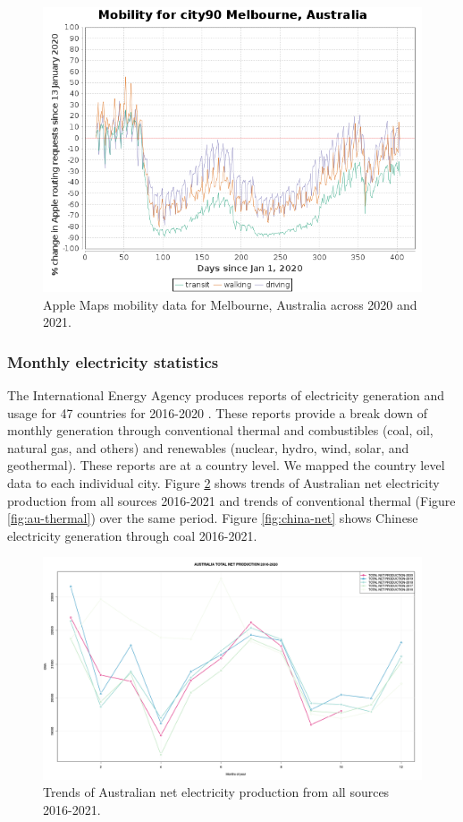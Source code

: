 \documentclass[final,3p,times,authoryear]{elsarticle}
\begin{document}
\begin{figure}
\centering
\includegraphics[width=.99\linewidth]{images/Applecity90MelbourneAustralia.png}
\caption{Apple Maps mobility data for Melbourne, Australia across 2020 and 2021.}
 \label{fig:apple}
\end{figure}

\subsubsection{Monthly electricity statistics}
The International Energy Agency produces reports of electricity generation and usage for 47 countries for 2016-2020 \citep{IEA2021}. These reports provide a break down of monthly generation through conventional thermal and combustibles (coal, oil, natural gas, and others) and renewables (nuclear, hydro, wind, solar, and geothermal). These reports are at a country level. We mapped the country level data to each individual city. Figure \ref{fig:au-total} shows trends of Australian net electricity production from all sources 2016-2021 and trends of conventional thermal (Figure \ref{fig:au-thermal}) over the same period. Figure \ref{fig:china-net} shows Chinese electricity generation through coal 2016-2021.


\begin{figure}
\centering
\includegraphics[width=.99\linewidth]{images/AUSTRALIATOTALNETPRODUCTION.png}
\caption{Trends of Australian net electricity production from all sources 2016-2021.}
 \label{fig:au-total}
\end{figure}
\end{document}
